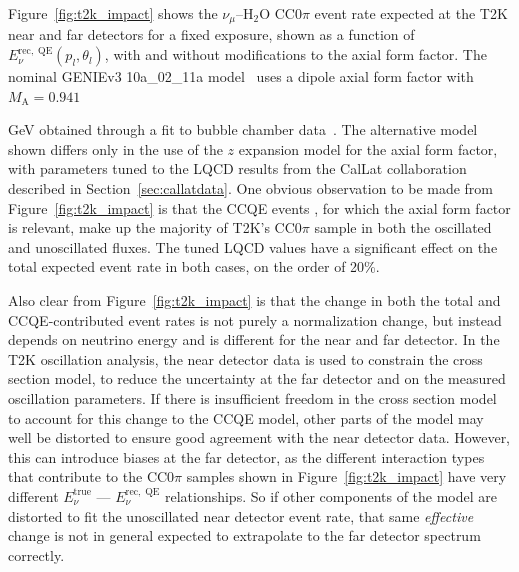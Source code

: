 \documentclass{ar-1col}
\begin{document}
Figure~\ref{fig:t2k_impact} shows the $\nu_{\mu}$--H$_{2}$O CC0$\pi$ event rate expected at the T2K near and far detectors for a fixed exposure, shown as a function of $E^{\mathrm{rec,\;QE}}_{\nu}\left(p_{l}, \theta_{l}\right)$, with and without modifications to the axial form factor. The nominal GENIEv3 10a\_02\_11a model~\cite{Andreopoulos:2009rq, GENIE:2021npt} uses a dipole axial form factor with $M_{\mathrm{A}} = 0.941$%
\begin{marginnote}
\end{marginnote}%
 GeV obtained through a fit to bubble chamber data~\cite{GENIE:2021zuu}. The alternative model shown differs only in the use of the $z$ expansion model for the axial form factor, with parameters tuned to the LQCD results from the CalLat collaboration described in Section~\ref{sec:callatdata}.
One obvious observation to be made from Figure~\ref{fig:t2k_impact} is that the CCQE events
, for which the axial form factor is relevant,
make up the majority of T2K's CC0$\pi$ sample
in both the oscillated and unoscillated fluxes.
The tuned LQCD values have a significant effect on the total expected event rate in both cases, on the order of 20\%.

Also clear from Figure~\ref{fig:t2k_impact} is that the change in both the total and CCQE-contributed event rates is not purely a normalization change, but instead depends on neutrino energy and is different for the near and far detector.
In the T2K oscillation analysis, the near detector data is used to constrain the cross section model, to reduce the uncertainty at the far detector and on the measured oscillation parameters. If there is insufficient freedom in the cross section model to account for this change to the CCQE model, other parts of the model may well be distorted to ensure good agreement with the near detector data.
However, this can introduce biases at the far detector, as the different interaction types that contribute to the CC0$\pi$ samples shown in Figure~\ref{fig:t2k_impact} have very different $E_{\nu}^{\mathrm{true}}$ --- $E^{\mathrm{rec,\;QE}}_{\nu}$ relationships. So if other components of the model are distorted to fit the unoscillated near detector event rate, that same {\it effective} change is not in general expected to extrapolate to the far detector spectrum correctly.
\end{document}
